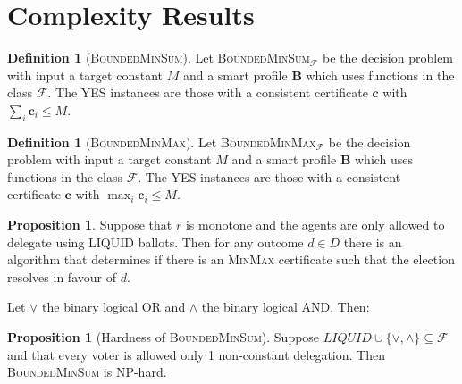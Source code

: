 \documentclass[11pt,a4paper, titlepage]{article}
\theoremstyle{definition}
\newtheorem{definition}[theorem]{Definition}
\newtheorem{proposition}[theorem]{Proposition}
\let\vec\mathbf
\begin{document}
\newpage



\section{Complexity Results}

\begin{definition}[\textsc{BoundedMinSum}]
    Let \textsc{BoundedMinSum}$_\mathcal{F}$ be the decision problem with input a target constant $M$ and a smart profile $\mathbf{B}$ which uses functions in the class $\mathcal{F}$. The YES instances are those with a consistent certificate  $\vec{c}$ with $\sum_i \vec{c}_i \leq M$. 
\end{definition}

\begin{definition}[\textsc{BoundedMinMax}]
    Let \textsc{BoundedMinMax}$_\mathcal{F}$ be the decision problem with input a target constant $M$ and a smart profile $\mathbf{B}$ which uses functions in the class $\mathcal{F}$. The YES instances are those with a consistent certificate  $\vec{c}$ with $\max_i \vec{c}_i \leq M$. 
\end{definition}

\begin{proposition}
    Suppose that $r$ is monotone and the agents are only allowed to delegate using LIQUID ballots. Then for any outcome $d \in D$ there is an algorithm that determines if there is an \textsc{MinMax} certificate such that the election resolves in favour of $d$.
\end{proposition}

Let $\lor$ the binary logical OR and $\land$ the binary logical AND. Then:

\begin{proposition}[Hardness of \textsc{BoundedMinSum}]
    Suppose $\mathit{LIQUID} \cup \{\lor, \land\} \subseteq \mathcal{F}$ and that every voter is allowed only 1 non-constant delegation. Then \textsc{BoundedMinSum} is NP-hard.    
\end{proposition}
\end{document}
